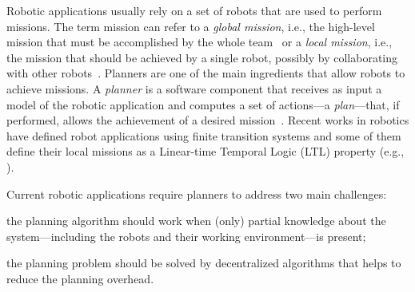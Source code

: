 Robotic applications usually rely on a set of robots that are used to perform missions.
The term mission can refer to a \emph{global mission}, i.e., the high-level mission that must be accomplished by the whole team~\cite{quottrup2004multi} or a \emph{local mission}, i.e., the mission that should be achieved by a single robot, possibly by collaborating with other robots~\cite{tumova2016multi}.
Planners are one of the main ingredients that allow robots to achieve  missions.
A \emph{planner} is  a software component that receives as input a model of the robotic application and computes  a set of actions---a \emph{plan}---that, if performed, allows the achievement of a desired mission~\cite{latombe2012robot}.
Recent works in robotics have defined robot applications using finite transition systems and some of them define their local missions as a Linear-time Temporal Logic (LTL) property (e.g., \cite{menghi2018multi,guo2015multi,tumova2016multi}).

Current robotic applications require planners to address two main challenges: 
\begin{enumerate*}
\item the planning algorithm should work when (only) partial knowledge about the system---including the robots and their working environment---is present;
\item the planning problem should be solved by decentralized algorithms that helps to reduce the planning overhead.
\end{enumerate*}



